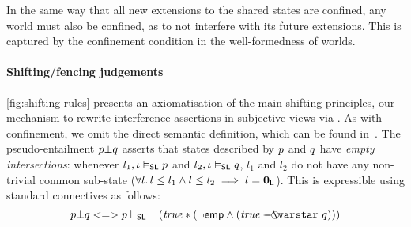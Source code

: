In the same way that all new extensions to the shared states are confined, any world
must also be confined, as to not interfere with its future extensions. This is captured by the confinement condition in the well-formedness of worlds.


\paragraph{Shifting/fencing judgements}
\fig\ref{fig:shifting-rules} presents an axiomatisation of the main
shifting principles, our mechanism to rewrite interference assertions
in subjective views via \shiftRule. As with confinement, we omit the
direct semantic definition, which can be found in~\cite{colosl-tr14}.
The
pseudo-entailment $\separate{\lass{P}}{\lass{Q}}$ asserts that states
described by $\lass{P}$ and $\lass{Q}$ have \emph{empty
  intersections}: whenever $l_1, \lenv \slsat \lass{P}$ and $l_2,
\lenv \slsat \lass{Q}$, $l_1$ and $l_2$ do not have any non-trivial
common sub-state ($\forall l.\, l \leq l_1 \land l \leq l_2 \implies l =
\mathbf{0}_{\mathsf{L}}$). This is expressible using standard connectives as follows:
\[
\separate{\lass{P}}{\lass{Q}} <=> \lass{P} \slentails \neg\left( \m{true} * (\neg\emp \land (\m{true} \septraction \lass{Q}) ) \right)
\]

